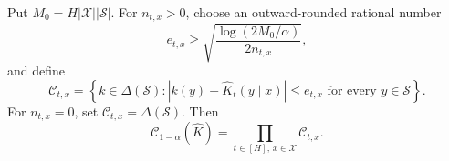 Put \(M_0=H|\mathcal X||\mathcal S|\).  For \(n_{t,x}>0\), choose an outward-rounded rational number
\[
 e_{t,x}\ge \sqrt{\frac{\log(2M_0/\alpha)}{2n_{t,x}}},
\]
and define
\[
 \mathcal C_{t,x}=\left\{k\in\Delta(\mathcal S):
 |k(y)-\widehat K_t(y\mid x)|\le e_{t,x}
 \text{ for every }y\in\mathcal S\right\}.
\]
For \(n_{t,x}=0\), set \(\mathcal C_{t,x}=\Delta(\mathcal S)\).  Then
\[
 \mathcal C_{1-\alpha}(\widehat K)=
 \prod_{t\in[H],\,x\in\mathcal X}\mathcal C_{t,x}.
\]